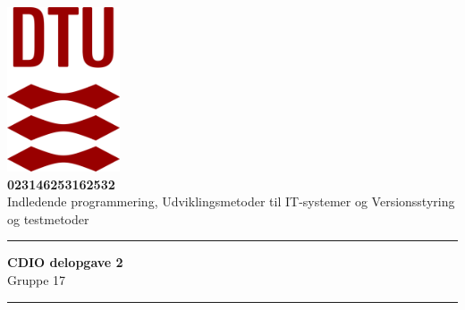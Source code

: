 


\begin{titlepage}
\begin{center}

    \includegraphics[width=0.25\textwidth]{Billeder/DTULogo.png} \\
    \vspace{0.5cm}
    \Large
    \textbf{02314\hspace{1cm}62531\hspace{1cm}62532} \\
    Indledende programmering, Udviklingsmetoder til IT-systemer og Versionsstyring og testmetoder
    \vspace{0.4cm}
    \hrule
    
    \vspace*{0.5cm}
    \huge
    \textbf{CDIO delopgave 2}\\
    \LARGE
    Gruppe 17
    \vspace{0.5cm}
    \hrule
    \vspace{0.2cm}


\end{center}
\end{titlepage}
